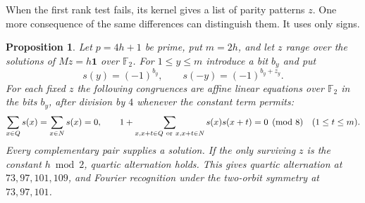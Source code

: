 \documentclass[11pt,a4paper]{article}
\newtheorem{proposition}[theorem]{Proposition}
\numberwithin{equation}{section}
\begin{document}
When the first rank test fails, its kernel gives a list of parity patterns $z$. One more consequence of the same differences can distinguish them. It uses only signs.

\begin{proposition}\label{prime:mod-eight}
Let $p=4h+1$ be prime, put $m=2h$, and let $z$ range over the solutions of $Mz=h\mathbf1$ over $\mathbb F_2$. For $1\le y\le m$ introduce a bit $b_y$ and put
$$s(y)=(-1)^{b_y},\qquad s(-y)=(-1)^{b_y+z_y}.$$
For each fixed $z$ the following congruences are affine linear equations over $\mathbb F_2$ in the bits $b_y$, after division by $4$ whenever the constant term permits:
\[
 \sum_{x\in Q}s(x)=\sum_{x\in N}s(x)=0,\qquad
 1+\sum_{\substack{x,x+t\in Q\ {\rm or}\ x,x+t\in N}}s(x)s(x+t)=0
 \pmod 8\quad(1\le t\le m).
\]
Every complementary pair supplies a solution. If the only surviving $z$ is the constant $h\bmod 2$, quartic alternation holds. This gives quartic alternation at $73,97,101,109$, and Fourier recognition under the two-orbit symmetry at $73,97,101$.
\end{proposition}
\end{document}
